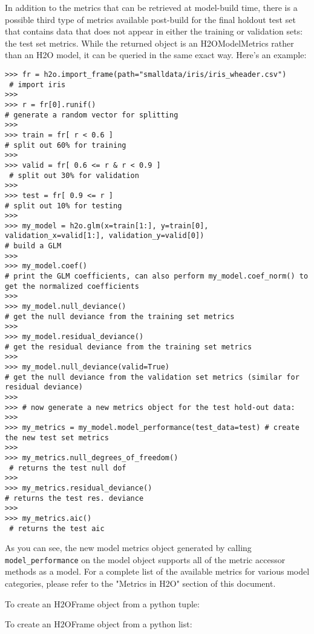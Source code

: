 In addition to the metrics that can be retrieved at model-build time, there is a possible third type of metrics available post-build for the final holdout test set that contains data that does not appear in either the training or validation sets: the test set metrics. While the returned object is an H2OModelMetrics rather than an H2O model, it can be queried in the same exact way. Here's an example:
\begin{lstlisting}[style=python]
>>> fr = h2o.import_frame(path="smalldata/iris/iris_wheader.csv")  
 # import iris
>>>
>>> r = fr[0].runif()                       
# generate a random vector for splitting
>>>
>>> train = fr[ r < 0.6 ]                   
# split out 60% for training
>>>
>>> valid = fr[ 0.6 <= r & r < 0.9 ]       
 # split out 30% for validation
>>>
>>> test = fr[ 0.9 <= r ]                   
# split out 10% for testing
>>>
>>> my_model = h2o.glm(x=train[1:], y=train[0], validation_x=valid[1:], validation_y=valid[0])  
# build a GLM
>>>
>>> my_model.coef()                         
# print the GLM coefficients, can also perform my_model.coef_norm() to get the normalized coefficients
>>>
>>> my_model.null_deviance()                
# get the null deviance from the training set metrics
>>>
>>> my_model.residual_deviance()            
# get the residual deviance from the training set metrics
>>>
>>> my_model.null_deviance(valid=True)      
# get the null deviance from the validation set metrics (similar for residual deviance)
>>>
>>> # now generate a new metrics object for the test hold-out data:
>>>
>>> my_metrics = my_model.model_performance(test_data=test) # create the new test set metrics
>>>
>>> my_metrics.null_degrees_of_freedom()   
 # returns the test null dof
>>>
>>> my_metrics.residual_deviance()          
# returns the test res. deviance
>>>
>>> my_metrics.aic()                       
 # returns the test aic
\end{lstlisting}

As you can see, the new model metrics object generated by calling \texttt{model\_performance} on the model object supports all of the metric accessor methods as a model. For a complete list of the available metrics for various model categories, please refer to the "Metrics in H2O" section of this document.

\waterExampleInPython
To create an H2OFrame object from a python tuple:


\waterExampleInPython
To create an H2OFrame object from a python list:


